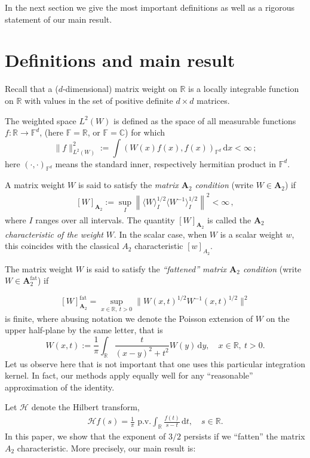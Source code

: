 \documentclass{amsart}
\newcommand{\C}{\mathbb{C}}
\newcommand{\R}{\mathbb{R}}
\theoremstyle{definition}
\theoremstyle{remark}
\begin{document}
In the next section we give the most important definitions as well as a rigorous statement of our main result.

\section{Definitions and main result}
\label{s:intro}


Recall that a ($d$-dimensional) matrix weight on $\R$  
is a locally integrable function on $\R$ 
with values in the set of positive definite $d\times d$ matrices.

%
The weighted space $L^2(W)$ 
is defined as the space of all measurable functions $f:\R \to \mathbb{F}^d$, (here $\mathbb{F}=\R$, or $\mathbb{F}=\C$) 
for which
\[
\| f\|_{L^2(W)}^2:=\int (W(x)f(x), f(x))_{\mathbb{F}^d} \,\mathrm{d} x <\infty\,;
\]
here $(\cdot, \cdot)_{\mathbb{F}^d}$ means the standard inner, respectively hermitian product in $\mathbb{F}^d$. 

A matrix weight $W$ is said to satisfy the \emph{matrix $\mathbf{A}_2$ condition} (write $W\in\mathbf{A}_2$) if 
\begin{align}\label{e:A2}
[W]_{\mathbf{A}_2} := \sup_I \left\| \langle W\rangle_ I^{1/2} \langle W^{-1}\rangle_ I^{1/2} \right\|^2  < 
\infty\, ,
\end{align}
where $I$ ranges over all intervals.
The quantity $[W]_{\mathbf{A}_2}$ is called the \emph{$\mathbf{A}_2$ characteristic of the weight} 
$W$.  In the scalar case, when $W$ is a scalar weight $w$, this coincides with the classical $A_2$ 
characteristic $[w]_{A_2}$. 



The matrix weight $W$ is said to satisfy the \emph{``fattened'' matrix $\mathbf{A}_2$ condition} (write $W\in\mathbf{A}^{\text{fat}}_2$) if 

\[[W]_{\mathbf{A}_2}^{\text{fat}}=\sup_{x\in\R,~t>0}\|W(x,t)^{1/2}W^{-1}(x,t)^{1/2}\|^2\]
is finite, where abusing notation we denote the Poisson extension of $W$ on the upper half-plane by the same letter, that is
\begin{equation*}
    W(x,t) := \frac{1}{\pi}\int_{\R}\frac{t}{(x-y)^2+t^2}W(y)\,\mathrm{d}y,\quad x\in\R,~t>0.
\end{equation*}
Let us observe here that is not important that one uses this particular integration kernel. In fact, our methods apply equally well for any ``reasonable'' approximation of the identity.

Let $\mathcal{H}$ denote the Hilbert transform, 
\begin{align*}
\mathcal{H} f(s) =\frac1\pi \text{ p.v.}\int_\R \frac{f(t)}{s-t} \,\mathrm{d} t,\quad s\in\R.
\end{align*}
In this paper, we show that the exponent of $3/2$ persists if we ``fatten'' the matrix $A_2$ characteristic.  More precisely, our main result is:
\end{document}
